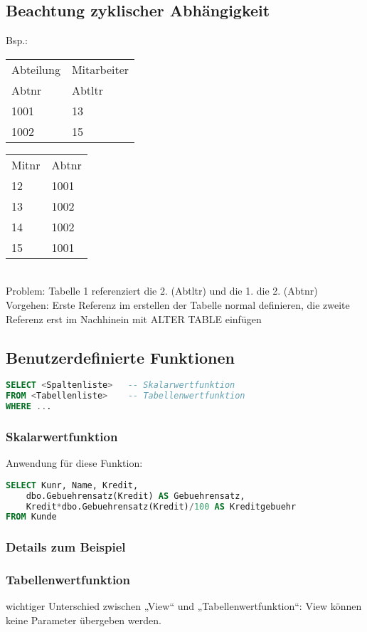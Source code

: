 \subsection{Beachtung zyklischer Abhängigkeit}
Bsp.:

\begin{tabular}{l l}
Abteilung &Mitarbeiter\\
Abtnr& Abtltr \\
\hline
1001 & 13\\
1002 & 15
\end{tabular}
\begin{tabular}{l l}
Mitnr & Abtnr\\
12 & 1001\\
13 & 1002\\
14 & 1002\\
15 & 1001\\
\end{tabular}\\
Problem: Tabelle 1 referenziert die 2. (Abtltr) und die 1. die 2. (Abtnr)\\
Vorgehen: Erste Referenz im erstellen der Tabelle normal definieren, die zweite Referenz erst im Nachhinein mit ALTER TABLE einfügen

\subsection{Benutzerdefinierte Funktionen}
\begin{lstlisting}[language=SQL]
SELECT <Spaltenliste>	-- Skalarwertfunktion
FROM <Tabellenliste>	-- Tabellenwertfunktion
WHERE ...
\end{lstlisting}
\subsubsection{Skalarwertfunktion}
Anwendung für diese Funktion:
\begin{lstlisting}[language=SQL]
SELECT Kunr, Name, Kredit,
	dbo.Gebuehrensatz(Kredit) AS Gebuehrensatz,
	Kredit*dbo.Gebuehrensatz(Kredit)/100 AS Kreditgebuehr
FROM Kunde
\end{lstlisting}
\subsubsection*{Details zum Beispiel}

\subsubsection{Tabellenwertfunktion}
wichtiger Unterschied zwischen „View“ und „Tabellenwertfunktion“: View können keine Parameter übergeben werden.
